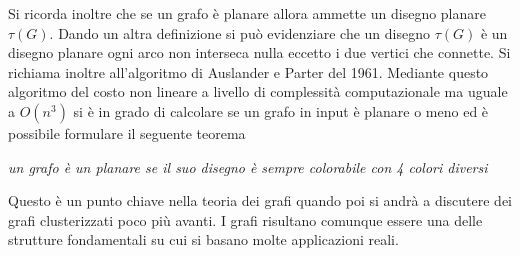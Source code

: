 {\begin{center}
\end{center}
Si ricorda inoltre che se un grafo è planare allora ammette un disegno planare $\tau(G)$. Dando un altra definizione si può evidenziare che un disegno $\tau(G)$ è un disegno planare ogni arco non interseca nulla eccetto i due vertici che connette. Si richiama inoltre all'algoritmo di Auslander e Parter del 1961. Mediante questo algoritmo del costo non lineare a livello di complessità computazionale ma uguale a $O(n^3)$ si è in grado di calcolare se un grafo in input è planare o meno ed è possibile formulare il seguente teorema
\begin{center}
	\textit{un grafo è un planare se il suo disegno è sempre colorabile con 4 colori diversi}
\end{center}
Questo è un punto chiave nella teoria dei grafi quando poi si andrà a discutere dei grafi clusterizzati poco più avanti.
I grafi risultano comunque essere una delle strutture fondamentali su cui si basano molte applicazioni reali.
}
